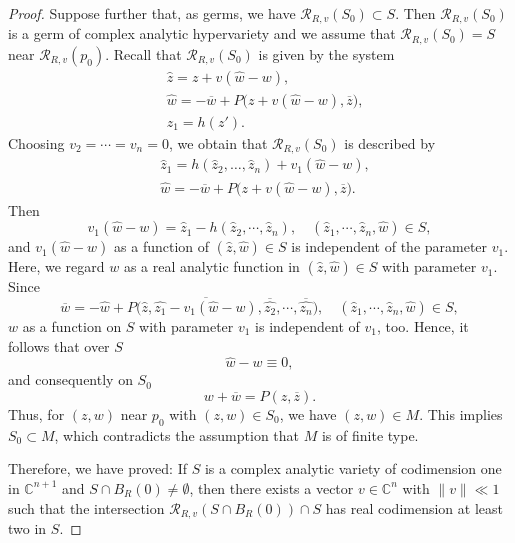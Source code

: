 \documentclass[a4paper,centertags,oneside,12pt]{amsart}
\numberwithin{equation}{section}
\begin{document}
\begin{proof}
Suppose further that, as germs, we have \(\mathcal R_{R,v}(S_0)\subset S\). Then $\mathcal R_{R, v}(S_0)$ is a germ of complex analytic hypervariety and we assume that $\mathcal R_{R, v}(S_0)=S$ near $\mathcal R_{R, v}(p_0)$.  Recall that \(\mathcal R_{R,v}(S_0)\) is given by the system
\begin{equation*}
\begin{split}
&\widehat z = z+v(\widehat w-w),\\
&\widehat w = -\overline w + P\bigl(z+v(\widehat w-w),\overline z\bigr),\\
&z_1 = h(z').
\end{split}
\end{equation*}
Choosing \(v_2=\cdots =v_{n}=0\), we obtain that 
\(\mathcal R_{R,v}(S_0)\) is described by
\begin{equation*}
\begin{split}
&\widehat z_1 = h(\widehat z_2,\dots ,\widehat z_{n}) + v_1(\widehat w-w),\\
&\widehat w = -\overline w + P\bigl(z+v(\widehat w-w),\overline z\bigr).
\end{split}
\end{equation*}
Then
\begin{equation*}
    v_1(\widehat w-w)=\widehat z_1-h(\widehat z_2, \cdots, \widehat z_n),\quad (\widehat z_1, \cdots, \widehat z_n, \widehat w)\in S,
\end{equation*}
and $v_1(\widehat w-w)$ as a function of $(\widehat{z},\widehat{w})\in S$ is independent of the parameter $v_1$. 
Here, we regard $w$ as a real analytic function in $(\widehat{z},\widehat{w})\in S$ with parameter $v_1$. Since 
$$\overline w = -\widehat w + P\bigl(\widehat{z}, \overline{\widehat{z_1}-v_1(\widehat{w}-w)},
\overline{\widehat{z_2}},\cdots,\overline{\widehat{z_n}}), \quad (\widehat z_1, \cdots, \widehat z_n, \widehat w)\in S,
$$
$w$ as a function on $S$ with parameter $v_1$ is independent of $v_1$, too.
Hence, it follows that over $S$
\[
\widehat w - w \equiv 0,
\]
and consequently on $S_0$
\[
w+\overline w = P(z,\overline z).
\]
Thus, for \((z,w)\) near \(p_0\) with \((z,w)\in S_0\), we have \((z,w)\in  M\). This implies \(S_0 \subset  M\), which contradicts the assumption  that \(M\) is of finite type.

Therefore, we have proved: If \(S\) is a complex analytic variety of codimension one in \(\mathbb C^{n+1}\) and \(S\cap B_R(0)\neq \emptyset\), then there exists a vector \(v\in\mathbb C^{n}\) with \(\|v\|\ll 1\) such that the intersection \(\mathcal R_{R,v}(S\cap B_R(0))\cap S\) has real codimension at least two in  $S$.
\end{proof}
\end{document}
